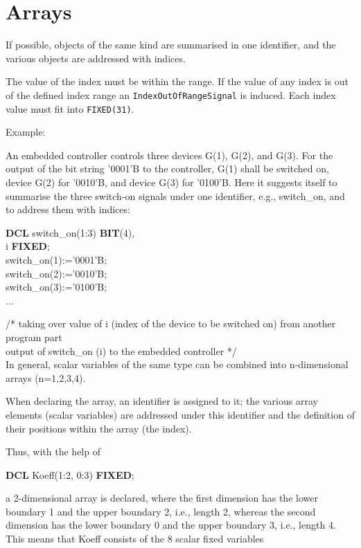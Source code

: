 \section{Arrays}   %

If possible, objects of the same kind are summarised in
one identifier, and the various objects are addressed with indices.

\begin{added}
The value of the index must be within the range.
If the value of any index is out of the defined index range
an \verb|IndexOutOfRangeSignal| is induced.
Each index value must fit into \verb|FIXED(31)|. 

\end{added}

Example:

An embedded controller controls three devices G(1), G(2), and G(3). For
the output of the bit string '0001'B to the controller, G(1) shall be
switched on, device G(2) for '0010'B, and device G(3) for '0100'B. Here it
suggests itself to summarise the three switch-on signals under one
identifier, e.g., switch\_on, and to address them with indices:

{\bf DCL} switch\_on(1:3) {\bf BIT}(4),\\
\x i {\bf FIXED};\\
switch\_on(1):='0001'B;\\
switch\_on(2):='0010'B;\\
switch\_on(3):='0100'B;\\
...

/* taking over value of i (index of the device to be switched on)
from another program part\\
output of switch\_on (i) to the embedded controller */\\

In general, scalar variables of the same type can be combined into
n-dimensional arrays (n=1,2,3,4).

When declaring the array, an identifier is assigned to it; the various
array elements (scalar variables) are addressed under this identifier
and the definition of their positions within the array (the index).

Thus, with the help of

{\bf DCL} Koeff(1:2, 0:3) {\bf FIXED};

a 2-dimensional array is declared, where the first dimension has the
lower boundary 1 and the upper boundary 2, i.e., length 2, whereas the
second dimension has the lower boundary 0 and the upper boundary 3,
i.e., length 4.  This means that Koeff consists of the 8 scalar fixed
variables

